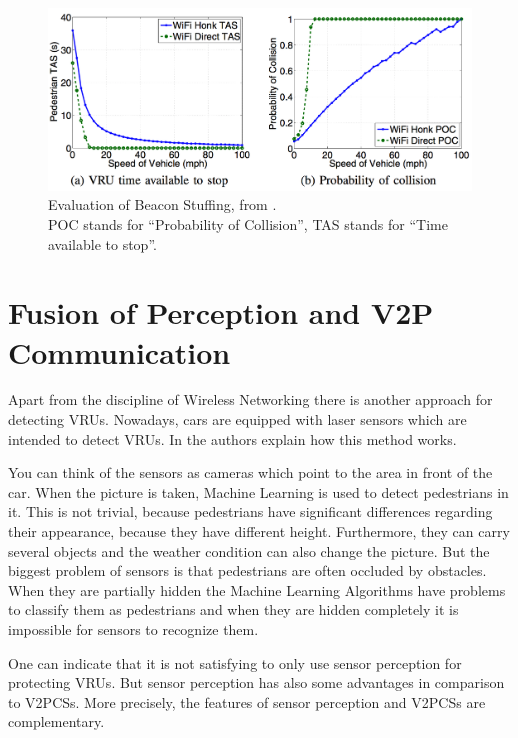 \documentclass[]{ccs-thesis}
\begin{document}
\begin{figure}[h]
	\centering
	\includegraphics[width=1\textwidth]{figures/6_beacon}
	\caption{Evaluation of Beacon Stuffing, from \cite{beacon}. \\POC stands for \enquote{Probability of Collision}, TAS stands for \enquote{Time available to stop}.}%
	\label{fig:beacon}%
\end{figure}

\section{Fusion of Perception and V2P Communication}\label{chap:fusion}

Apart from the discipline of Wireless Networking there is another approach for detecting \acp{VRU}. Nowadays, cars are equipped with laser sensors which are intended to detect \acp{VRU}. In \cite{2010perception} the authors explain how this method works.

You can think of the sensors as cameras which point to the area in front of the car. When the picture is taken, Machine Learning is used to detect pedestrians in it. This is not trivial, because pedestrians have significant differences regarding their appearance, because they have different height. Furthermore, they can carry several objects and the weather condition can also change the picture. But the biggest problem of sensors is that pedestrians are often occluded by obstacles. When they are partially hidden the Machine Learning Algorithms have problems to classify them as pedestrians and when they are hidden completely it is impossible for sensors to recognize them.

One can indicate that it is not satisfying to only use sensor perception for protecting \acp{VRU}. But sensor perception has also some advantages in comparison to \acp{V2PCS}. More precisely, the features of sensor perception and \acp{V2PCS} are complementary.
\end{document}
